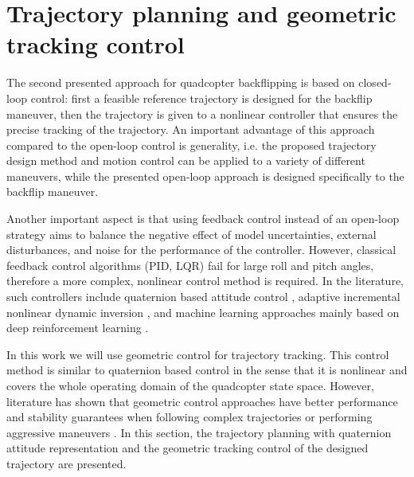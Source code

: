 \section{Trajectory planning and geometric tracking control}

The second presented approach for quadcopter backflipping is based on closed-loop control: first a feasible reference trajectory is designed for the backflip maneuver, then the trajectory is given to a nonlinear controller that ensures the precise tracking of the trajectory. An important advantage of this approach compared to the open-loop control is generality, i.e. the proposed trajectory design method and motion control can be applied to a variety of different maneuvers, while the presented open-loop approach is designed specifically to the backflip maneuver.

Another important aspect is that using feedback control instead of an open-loop strategy aims to balance the negative effect of model uncertainties, external disturbances, and noise for the performance of the controller. However, classical feedback control algorithms (PID, LQR) fail for large roll and pitch angles, therefore a more complex, nonlinear control method is required. In the literature, such controllers include quaternion based attitude control \cite{quaternion}, adaptive incremental nonlinear dynamic inversion \cite{indi2015}, and machine learning approaches mainly based on deep reinforcement learning \cite{drone-racing-deep-rl,deep_acrobatics, quadrotor-control-rl}. 

In this work we will use geometric control for trajectory tracking. This control method is similar to quaternion based control in the sense that it is nonlinear and covers the whole operating domain of the quadcopter state space. However, literature has shown that geometric control approaches have better performance and stability guarantees when following complex trajectories or performing aggressive maneuvers \cite{lelemc2010, turpinkumar2011, mellinger2011}. In this section, the trajectory planning with quaternion attitude representation and the geometric tracking control of the designed trajectory are presented.


